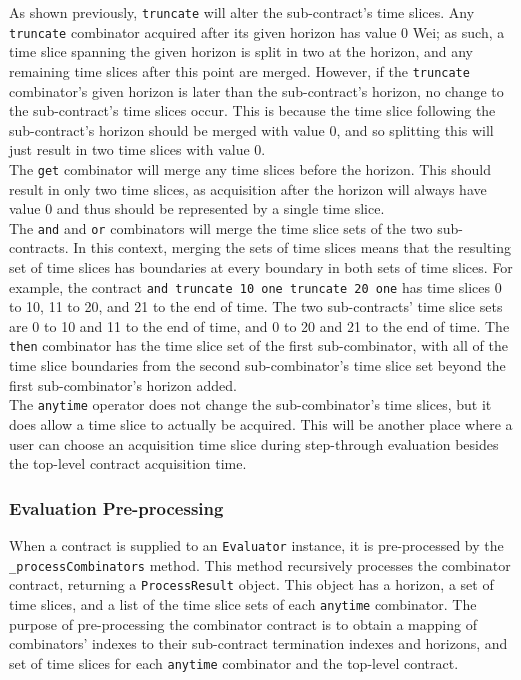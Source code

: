 As shown previously, \texttt{truncate} will alter the sub-contract's time slices. Any \texttt{truncate} combinator acquired after its given horizon has value 0 Wei; as such, a time slice spanning the given horizon is split in two at the horizon, and any remaining time slices after this point are merged. However, if the \texttt{truncate} combinator's given horizon is later than the sub-contract's horizon, no change to the sub-contract's time slices occur. This is because the time slice following the sub-contract's horizon should be merged with value 0, and so splitting this will just result in two time slices with value 0. \\

The \texttt{get} combinator will merge any time slices before the horizon. This should result in only two time slices, as acquisition after the horizon will always have value 0 and thus should be represented by a single time slice. \\

The \texttt{and} and \texttt{or} combinators will merge the time slice sets of the two sub-contracts. In this context, merging the sets of time slices means that the resulting set of time slices has boundaries at every boundary in both sets of time slices. For example, the contract \texttt{and truncate 10 one truncate 20 one} has time slices 0 to 10, 11 to 20, and 21 to the end of time. The two sub-contracts' time slice sets are 0 to 10 and 11 to the end of time, and 0 to 20 and 21 to the end of time. The \texttt{then} combinator has the time slice set of the first sub-combinator, with all of the time slice boundaries from the second sub-combinator's time slice set beyond the first sub-combinator's horizon added. \\

The \texttt{anytime} operator does not change the sub-combinator's time slices, but it does allow a time slice to actually be acquired. This will be another place where a user can choose an acquisition time slice during step-through evaluation besides the top-level contract acquisition time.


\subsubsection{Evaluation Pre-processing}

When a contract is supplied to an \texttt{Evaluator} instance, it is pre-processed by the \texttt{_process\-Combinators} method. This method recursively processes the combinator contract, returning a \texttt{ProcessResult} object. This object has a horizon, a set of time slices, and a list of the time slice sets of each \texttt{anytime} combinator. The purpose of pre-processing the combinator contract is to obtain a mapping of combinators' indexes to their sub-contract termination indexes and horizons, and set of time slices for each \texttt{anytime} combinator and the top-level contract. \\

